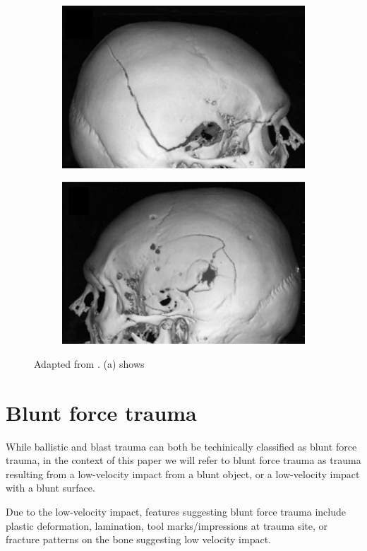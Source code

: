 \documentclass[titlepage]{article}
\begin{document}
\begin{figure}[h!]
\centering
\begin{subfigure}{.5\textwidth}
  \centering
  \includegraphics[width=.7\linewidth]{entrance_wound}
  \end{subfigure}%
\begin{subfigure}{.5\textwidth}
  \centering
  \includegraphics[width=.7\linewidth]{exit_wound}
\end{subfigure}
\caption{Adapted from \cite{post-imaging}. (a) shows }
\label{fig:imaging_gunshot}
\end{figure}

\newpage
\section{Blunt force trauma}
While ballistic and blast trauma can both be techinically classified as blunt force trauma, in the context of this paper we will refer to blunt force trauma as trauma resulting from a low-velocity impact from a blunt object, or a low-velocity impact with a blunt surface.


Due to the low-velocity impact, features suggesting blunt force trauma include plastic deformation, lamination, tool marks/impressions at trauma site, or fracture patterns on the bone suggesting low velocity impact.\cite{trauma}
\end{document}
